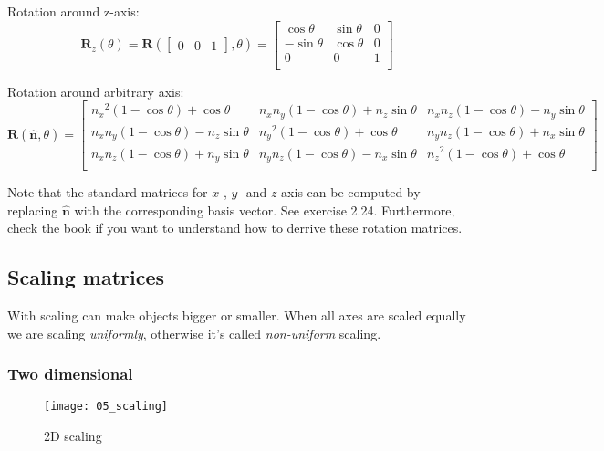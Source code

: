 Rotation around z-axis: \\
$$
\mathbf{R}_{z}(\theta) =
\mathbf{R}(
\begin{bmatrix}
0 & 0 & 1
\end{bmatrix},
\theta) =
\begin{bmatrix}
{\cos\theta} & {\sin\theta} & 0 \\
{- \sin\theta} & {\cos\theta} & 0 \\
0 & 0 & 1 \\
\end{bmatrix}
$$

Rotation around arbitrary axis: \\
$$
\mathbf{R}(\hat{\mathbf{n}},\theta) =
\begin{bmatrix}
{{n_{x}}^{2}\left( 1 - \cos\theta \right) + \cos\theta} & {n_{x}n_{y}\left( 1 - \cos\theta \right) + n_{z}\sin\theta} & {n_{x}n_{z}\left( 1 - \cos\theta \right) - n_{y}\sin\theta} \\
{n_{x}n_{y}\left( 1 - \cos\theta \right) - n_{z}\sin\theta} & {{n_{y}}^{2}\left( 1 - \cos\theta \right) + \cos\theta} & {n_{y}n_{z}\left( 1 - \cos\theta \right) + n_{x}\sin\theta} \\
{n_{x}n_{z}\left( 1 - \cos\theta \right) + n_{y}\sin\theta} & {n_{y}n_{z}\left( 1 - \cos\theta \right) - n_{x}\sin\theta} & {{n_{z}}^{2}\left( 1 - \cos\theta \right) + \cos\theta} \\
\end{bmatrix}
$$

Note that the standard matrices for $x$-, $y$- and $z$-axis can be computed by replacing $\hat{\textbf{n}}$ with the corresponding basis vector. See exercise 2.24. Furthermore, check the book if you want to understand how to derrive these rotation matrices.

\subsection{Scaling matrices}

With scaling can make objects bigger or smaller. When all axes are scaled equally we are scaling \textit{uniformly}, otherwise it's called \textit{non-uniform} scaling.

\subsubsection{Two dimensional}

\begin{figure}[H]
\centering
    \texttt{[image: 05\_scaling]}
\caption{2D scaling}
\label{fig:2d-scaling}
\end{figure}

